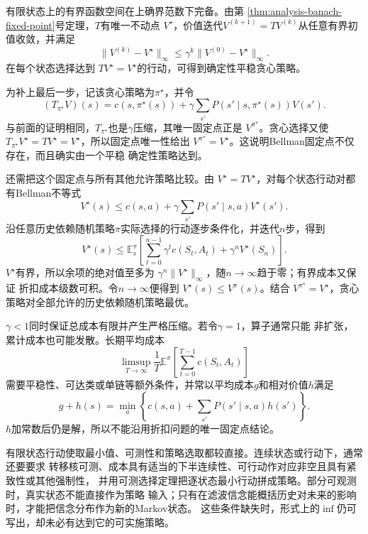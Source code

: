 有限状态上的有界函数空间在上确界范数下完备。由第
\ref{thm:analysis-banach-fixed-point}号定理，\(T\)有唯一不动点
\(V^\star\)，价值迭代\(V^{(k+1)}=TV^{(k)}\)从任意有界初值收敛，并满足
\begin{equation}
  \lVert V^{(k)}-V^\star\rVert_\infty
  \leq
  \gamma^k
  \lVert V^{(0)}-V^\star\rVert_\infty.
  \label{eq:decision-value-iteration-error}
\end{equation}
在每个状态选择达到
\(TV^\star=V^\star\)的行动，可得到确定性平稳贪心策略。

为补上最后一步，记该贪心策略为\(\pi^\star\)，并令
\[
  (T_{\pi^\star}V)(s)
  =
  c(s,\pi^\star(s))
  +
  \gamma\sum_{s'}P(s'\mid s,\pi^\star(s))V(s').
\]
与前面的证明相同，\(T_{\pi^\star}\)也是\(\gamma\)压缩，其唯一固定点正是
\(V^{\pi^\star}\)。贪心选择又使
\(T_{\pi^\star}V^\star=TV^\star=V^\star\)，所以固定点唯一性给出
\(V^{\pi^\star}=V^\star\)。这说明Bellman固定点不仅存在，而且确实由一个平稳
确定性策略达到。

还需把这个固定点与所有其他允许策略比较。由
\(V^\star=TV^\star\)，对每个状态行动对都有Bellman不等式
\[
  V^\star(s)
  \leq
  c(s,a)+\gamma\sum_{s'}P(s'\mid s,a)V^\star(s').
\]
沿任意历史依赖随机策略\(\pi\)实际选择的行动逐步条件化，并迭代\(n\)步，得到
\begin{equation}
  V^\star(s)
  \leq
  \mathbb{E}_{s}^{\pi}\left[
    \sum_{t=0}^{n-1}\gamma^t c(S_t,A_t)
    +\gamma^nV^\star(S_n)
  \right].
  \label{eq:decision-discounted-all-policy-comparison}
\end{equation}
\(V^\star\)有界，所以余项的绝对值至多为
\(\gamma^n\lVert V^\star\rVert_\infty\)，随\(n\to\infty\)趋于零；有界成本又保证
折扣成本级数可积。令\(n\to\infty\)便得到
\(V^\star(s)\leq V^\pi(s)\)。结合
\(V^{\pi^\star}=V^\star\)，贪心策略对全部允许的历史依赖随机策略最优。

\(\gamma<1\)同时保证总成本有限并产生严格压缩。若令\(\gamma=1\)，算子通常只能
非扩张，累计成本也可能发散。长期平均成本
\[
  \limsup_{T\to\infty}
  \frac1T
  \mathbb{E}^\pi\left[\sum_{t=0}^{T-1}c(S_t,A_t)\right]
\]
需要平稳性、可达类或单链等额外条件，并常以平均成本\(g\)和相对价值\(h\)满足
\[
  g+h(s)
  =
  \min_a
  \left\{
    c(s,a)+\sum_{s'}P(s'\mid s,a)h(s')
  \right\}.
\]
\(h\)加常数后仍是解，所以不能沿用折扣问题的唯一固定点结论。

有限状态行动使取最小值、可测性和策略选取都较直接。连续状态或行动下，通常还要要求
转移核可测、成本具有适当的下半连续性、可行动作对应非空且具有紧致性或其他强制性，
并用可测选择定理把逐状态最小行动拼成策略。部分可观测时，真实状态不能直接作为策略
输入；只有在滤波信念能概括历史对未来的影响时，才能把信念分布作为新的Markov状态。
这些条件缺失时，形式上的\(\inf\)仍可写出，却未必有达到它的可实施策略。

